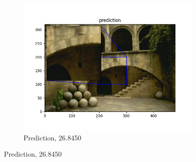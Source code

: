 \documentclass[12pt]{article}
\begin{document}
\begin{figure}[h!]
\begin{subfigure}[b]{0.32\linewidth}
    \includegraphics[width=\linewidth]{./7-prediction.png}
    \caption{Prediction, 26.8450}
  \end{subfigure}


\end{figure}
\end{document}
